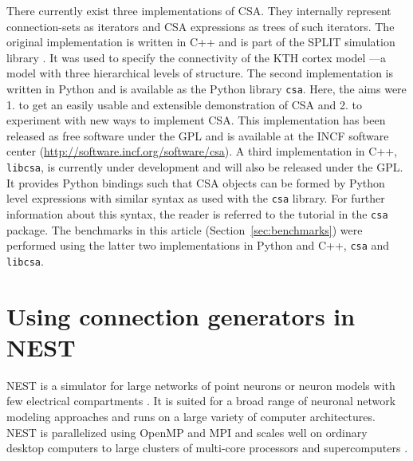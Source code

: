 \documentclass{frontiersSCNS} %
\begin{document}
There currently exist three implementations of CSA.  They internally
represent connection-sets as iterators and CSA expressions as trees of
such iterators. The original
implementation is written in C++ and is part of the SPLIT simulation
library \citep{djurfeldt05}.  It was used to specify the connectivity
of the KTH cortex model \citep{djurfeldt08}---a model with three
hierarchical levels of structure.  The second implementation is
written in Python and is available as the Python library \verb|csa|.
Here, the aims were 1. to get an easily usable and extensible
demonstration of CSA and 2. to experiment with new ways to implement
CSA. This implementation has been released as free software under the
GPL and is available at the INCF software center
(\url{http://software.incf.org/software/csa}). A third implementation
in C++, \verb|libcsa|, is currently under development and will also be
released under the GPL. It provides Python bindings such that CSA
objects can be formed by Python level expressions with similar syntax
as used with the \verb|csa| library. For further information about
this syntax, the reader is referred to the tutorial in the \verb|csa|
package. The benchmarks in this article (Section~\ref{sec:benchmarks})
were performed using the latter two implementations in Python and C++,
\verb|csa| and \verb|libcsa|.




\section{Using connection generators in NEST}\label{sec:conn_gen_nest}

NEST is a simulator for large networks of point neurons or neuron
models with few electrical compartments
\citep[\url{http://www.nest-simulator.org};][]{Gewaltig_07_11204}. It
is suited for a broad range of neuronal network modeling approaches
and runs on a large variety of computer architectures. NEST is
parallelized using OpenMP \citep{OpenMPSpec} and MPI
\citep{MPIForum94} and scales well on ordinary desktop computers to
large clusters of multi-core processors and supercomputers
\citep{Helias12_26}.
\end{document}
